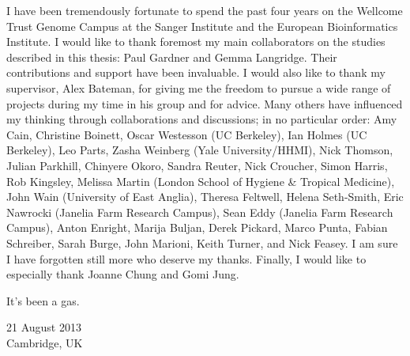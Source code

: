 

\begin{acknowledgementslong} 

I have been tremendously fortunate to spend the past four years on the Wellcome Trust Genome Campus at the Sanger Institute and the European Bioinformatics Institute. I would like to thank foremost my main collaborators on the studies described in this thesis: Paul Gardner and Gemma Langridge. Their contributions and support have been invaluable. I would also like to thank my supervisor, Alex Bateman, for giving me the freedom to pursue a wide range of projects during my time in his group and for advice. Many others have influenced my thinking through collaborations and discussions; in no particular order: Amy Cain, Christine Boinett, Oscar Westesson (UC Berkeley), Ian Holmes (UC Berkeley), Leo Parts, Zasha Weinberg (Yale University/HHMI), Nick Thomson, Julian Parkhill, Chinyere Okoro, Sandra Reuter, Nick Croucher, Simon Harris, Rob Kingsley, Melissa Martin (London School of Hygiene \& Tropical Medicine), John Wain (University of East Anglia), Theresa Feltwell, Helena Seth-Smith, Eric Nawrocki (Janelia Farm Research Campus), Sean Eddy (Janelia Farm Research Campus), Anton Enright, Marija Buljan, Derek Pickard, Marco Punta, Fabian Schreiber, Sarah Burge, John Marioni, Keith Turner, and Nick Feasey. I am sure I have forgotten still more who deserve my thanks. Finally, I would like to especially thank Joanne Chung and Gomi Jung. 

\vspace{\baselineskip}
\noindent
It's been a gas.

\vspace{10 mm}
\noindent
 \begin{flushright}
21 August 2013\\
Cambridge, UK
\end{flushright}

\end{acknowledgementslong}


